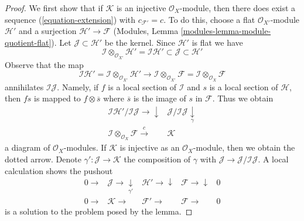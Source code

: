 \begin{proof}

We first show that if $\mathcal{K}$ is an injective $\mathcal{O}_X$-module,
then there does exist a sequence (\ref{equation-extension}) with
$c_{\mathcal{F}'} = c$. To do this, choose a flat
$\mathcal{O}_{X'}$-module $\mathcal{H}'$ and a surjection
$\mathcal{H}' \to \mathcal{F}$
(Modules, Lemma \ref{modules-lemma-module-quotient-flat}).
Let $\mathcal{J} \subset \mathcal{H}'$ be the kernel. Since $\mathcal{H}'$
is flat we have
$$
\mathcal{I} \otimes_{\mathcal{O}_{X'}} \mathcal{H}' =
\mathcal{I}\mathcal{H}'
\subset \mathcal{J} \subset \mathcal{H}'
$$
Observe that the map
$$
\mathcal{I}\mathcal{H}' =
\mathcal{I} \otimes_{\mathcal{O}_{X'}} \mathcal{H}'
\longrightarrow
\mathcal{I} \otimes_{\mathcal{O}_{X'}} \mathcal{F} =
\mathcal{I} \otimes_{\mathcal{O}_X} \mathcal{F}
$$
annihilates $\mathcal{I}\mathcal{J}$. Namely, if $f$ is a local section
of $\mathcal{I}$ and $s$ is a local section of $\mathcal{H}$, then
$fs$ is mapped to $f \otimes \overline{s}$ where $\overline{s}$ is
the image of $s$ in $\mathcal{F}$. Thus we obtain
$$
\begin{array}{cc}\mathcal{I}\mathcal{H}'/\mathcal{I}\mathcal{J}
\longrightarrow\downarrow & \mathcal{J}/\mathcal{I}\mathcal{J} \underset{\gamma}{\downarrow} \\ \mathcal{I} \otimes_{\mathcal{O}_X} \mathcal{F} \overset{c}{\longrightarrow} & \mathcal{K}\end{array}
$$
a diagram of $\mathcal{O}_X$-modules. If $\mathcal{K}$ is injective
as an $\mathcal{O}_X$-module, then we obtain the dotted arrow.
Denote $\gamma' : \mathcal{J} \to \mathcal{K}$ the composition
of $\gamma$ with $\mathcal{J} \to \mathcal{J}/\mathcal{I}\mathcal{J}$.
A local calculation shows the pushout
$$
\begin{array}{ccccc}0 \longrightarrow & \mathcal{J} \longrightarrow\underset{\gamma'}{\downarrow} & \mathcal{H}' \longrightarrow\downarrow & \mathcal{F} \longrightarrow\downarrow & 0 \\ 0 \longrightarrow & \mathcal{K} \longrightarrow & \mathcal{F}' \longrightarrow & \mathcal{F} \longrightarrow & 0\end{array}
$$
is a solution to the problem posed by the lemma.


\end{proof}
